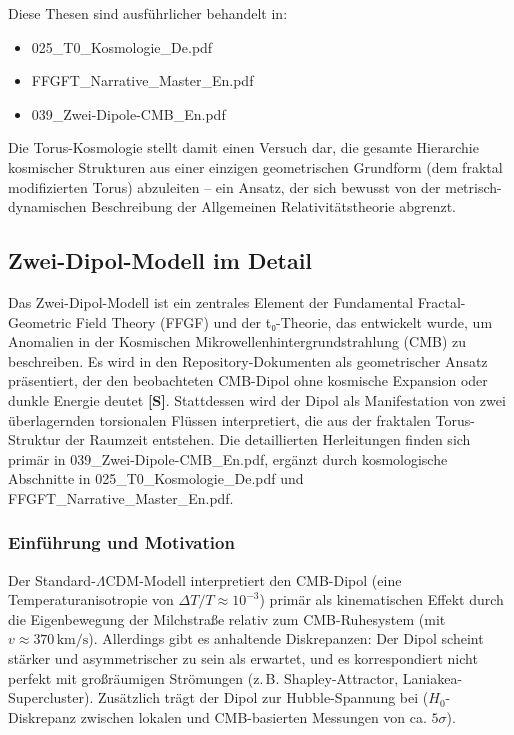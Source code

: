 	Diese Thesen sind ausführlicher behandelt in:
	\begin{itemize}
		\item 025\_T0\_Kosmologie\_De.pdf
		\item FFGFT\_Narrative\_Master\_En.pdf
		\item 039\_Zwei-Dipole-CMB\_En.pdf
	\end{itemize}
	
	Die Torus-Kosmologie stellt damit einen Versuch dar, die gesamte Hierarchie kosmischer Strukturen aus einer einzigen geometrischen Grundform (dem fraktal modifizierten Torus) abzuleiten – ein Ansatz, der sich bewusst von der metrisch-dynamischen Beschreibung der Allgemeinen Relativitätstheorie abgrenzt.
	\subsection{Zwei-Dipol-Modell im Detail}
	
	Das Zwei-Dipol-Modell ist ein zentrales Element der Fundamental Fractal-Geometric Field Theory (FFGF) und der t₀-Theorie, das entwickelt wurde, um Anomalien in der Kosmischen Mikrowellenhintergrundstrahlung (CMB) zu beschreiben. Es wird in den Repository-Dokumenten als geometrischer Ansatz präsentiert, der den beobachteten CMB-Dipol ohne kosmische Expansion oder dunkle Energie deutet \textbf{[S]}. Stattdessen wird der Dipol als Manifestation von zwei überlagernden torsionalen Flüssen interpretiert, die aus der fraktalen Torus-Struktur der Raumzeit entstehen. Die detaillierten Herleitungen finden sich primär in 039\_Zwei-Dipole-CMB\_En.pdf, ergänzt durch kosmologische Abschnitte in 025\_T0\_Kosmologie\_De.pdf und FFGFT\_Narrative\_Master\_En.pdf.
	
	\subsubsection{Einführung und Motivation}
	
	Der Standard-$\Lambda$CDM-Modell interpretiert den CMB-Dipol (eine Temperaturanisotropie von $\Delta T / T \approx 10^{-3}$) primär als kinematischen Effekt durch die Eigenbewegung der Milchstraße relativ zum CMB-Ruhesystem (mit $v \approx 370\,\text{km/s}$). Allerdings gibt es anhaltende Diskrepanzen: Der Dipol scheint stärker und asymmetrischer zu sein als erwartet, und es korrespondiert nicht perfekt mit großräumigen Strömungen (z.\,B. Shapley-Attractor, Laniakea-Supercluster). Zusätzlich trägt der Dipol zur Hubble-Spannung bei ($H_0$-Diskrepanz zwischen lokalen und CMB-basierten Messungen von ca. $5\sigma$).
	
